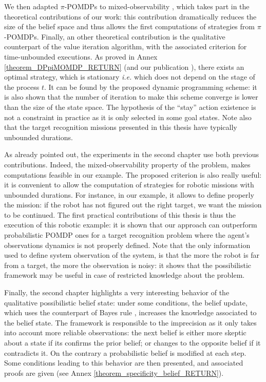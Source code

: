We then adapted $\pi$-POMDPs 
to mixed-observability \cite{OngShaoHsuWee-IJRR10},
which takes part in the theoretical contributions of our work:
this contribution dramatically reduces the size of the belief space 
and thus allows the first computations of strategies from $\pi$-POMDPs. 
Finally, an other theoretical contribution 
is the qualitative counterpart of the value iteration algorithm,
with the associated criterion for time-unbounded executions. 
As proved in Annex \ref{theorem_DPpiMOMDP_RETURN}
(and our publication \cite{Drougard13}), 
there exists an optimal strategy, 
which is stationary 
\textit{i.e.} which does not depend on the stage of the process $t$. 
It can be found by the proposed dynamic programming scheme: 
it is also shown that the number of iteration to make this scheme converge 
is lower than the size of the state space.
The hypothesis of the ``stay'' action existence
is not a constraint in practice
as it is only selected in some goal states.
Note also that the target recognition missions presented in this thesis 
have typically unbounded durations.

As already pointed out,
the experiments in the second chapter 
use both previous contributions.
Indeed, the mixed-observability property of the problem,
makes computations feasible in our example.
The proposed criterion is also really useful: 
it is convenient to allow the computation of strategies 
for robotic missions with unbounded durations.
For instance, in our example, 
it allows to define properly the mission: 
if the robot has not figured out the right target,
we want the mission to be continued.
The first practical contributions of this thesis 
is thus the execution of this robotic example:
it is shown that our approach 
can outperform probabilistic POMDP ones 
for a target recognition problem 
where the agent's observations dynamics 
is not properly defined.
Note that the only information used to define system observation of the system,
is that the more the robot is far from a target, 
the more the observation is noisy:
it shows that the possibilistic framework
may be useful in case of restricted knowledge about the problem.


Finally, the second chapter highlights 
a very interesting behavior 
of the qualitative possibilistic belief state:
under some conditions, 
the belief update, 
which uses the counterpart of Bayes rule \cite{Dubois199023},
increases the knowledge associated to the belief state.
The framework is responsible to the imprecision 
as it only takes into account 
more reliable observations:
the next belief is either more skeptic 
about a state if its confirms the prior belief; 
or changes to the opposite belief if it contradicts it.
On the contrary a probabilistic belief is modified at each step. 
Some conditions leading to this behavior are then presented,
and associated proofs are given (see Annex \ref{theorem_specificity_belief_RETURN}).

